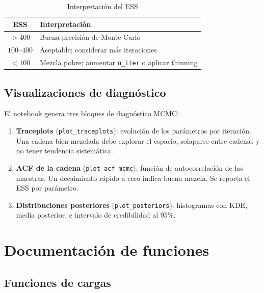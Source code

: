 \documentclass[12pt, a4paper]{article}
\theoremstyle{plain}
\theoremstyle{definition}
\theoremstyle{remark}
\begin{document}
\begin{table}[H]
\centering
\caption{Interpretación del ESS}
\small
\begin{tabular}{cl}
\toprule
\textbf{ESS} & \textbf{Interpretación} \\
\midrule
$> 400$ & Buena precisión de Monte Carlo \\
$100$--$400$ & Aceptable; considerar más iteraciones \\
$< 100$ & Mezcla pobre; aumentar \texttt{n\_iter} o aplicar thinning \\
\bottomrule
\end{tabular}
\end{table}

\subsection{Visualizaciones de diagnóstico}

El notebook genera tres bloques de diagnóstico MCMC:

\begin{enumerate}[leftmargin=1.5em]
  \item \textbf{Traceplots} (\texttt{plot\_traceplots}): evolución de los parámetros
        por iteración. Una cadena bien mezclada debe explorar el espacio,
        solaparse entre cadenas y no tener tendencia sistemática.
  \item \textbf{ACF de la cadena} (\texttt{plot\_acf\_mcmc}): función de
        autocorrelación de las muestras. Un decaimiento rápido a cero indica
        buena mezcla. Se reporta el ESS por parámetro.
  \item \textbf{Distribuciones posteriores} (\texttt{plot\_posteriors}):
        histogramas con KDE, media posterior, e intervalo de credibilidad al 95\%.
\end{enumerate}

\section{Documentación de funciones}

\subsection{Funciones de cargas}
\end{document}
